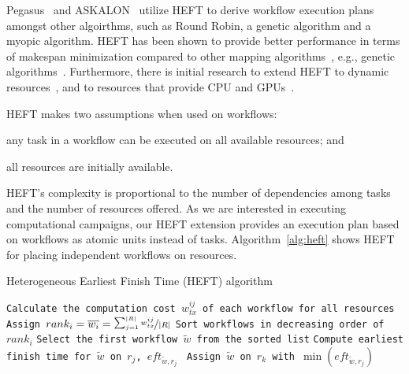 Pegasus~\cite{deelman2015pegasus} and ASKALON~\cite{fahringer2005askalon}
utilize HEFT to derive workflow execution plans amongst other algoirthms, such 
as Round Robin, a genetic algorithm and a myopic algorithm. HEFT
has been shown to provide better performance in terms of makespan minimization
compared to other mapping
algorithms~\cite{topcuoglu2002performance,canon2008comparative}, e.g., genetic
algorithms~\cite{fahringer2005askalon}. Furthermore, there is initial
research to extend HEFT to dynamic resources~\cite{dong2007pfas}, and to
resources that provide CPU and GPUs~\cite{shetti2013optimization}.

HEFT makes two assumptions when used on workflows:
\begin{inparaenum}[(1)]
    \item any task in a workflow can be executed on all available resources; and
    \item all resources are initially available.
\end{inparaenum}
HEFT's complexity is proportional to the number of dependencies among tasks
and the number of resources offered. As we are interested in executing
computational campaigns, our HEFT extension provides an execution plan based
on workflows as atomic units instead of tasks. Algorithm~\ref{alg:heft} shows
HEFT for placing independent workflows on resources.

\begin{algorithm}[t]
    \caption{Heterogeneous Earliest Finish Time (HEFT) algorithm}
    \label{alg:heft}
    \scriptsize
    \begin{algorithmic}[1]
        \State \texttt{Calculate the computation cost $w_{tx}^{ij}$ of each workflow for all resources}
        \State \texttt{Assign $rank_i = \overline{w_{i}} = \nicefrac{\sum_{j=1}^{|R|}w_{tx}^{ij}}{|R|}$}
        \State \texttt{Sort workflows in decreasing order of $rank_i$}
        \State \texttt{Select the first workflow $\tilde{w}$ from the sorted list}
        \State\texttt{Compute earliest finish time for $\tilde{w}$ on $r_{j}$, $eft_{\tilde{w},r_j}$ }
        \EndFor
        \State \texttt{Assign  $\tilde{w}$ on $r_k$ with $\min{(eft_{\tilde{w},r_j})}$}
        \EndWhile
        \EndProcedure
    \end{algorithmic}
\end{algorithm}

